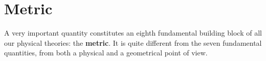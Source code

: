 \documentclass[a4paper,12pt,%
onecolumn,oneside,%
british%
]{memoir}
\renewcommand*{\|}[1][]{\nonscript\:#1\vert\nonscript\:\mathopen{}}
\begin{document}

\section{Metric}
\label{sec:metric}

A very important quantity constitutes an eighth fundamental building block of all our physical theories: the \textbf{metric}. It is quite different from the seven fundamental quantities, from both a physical and a geometrical point of view.
\end{document}
